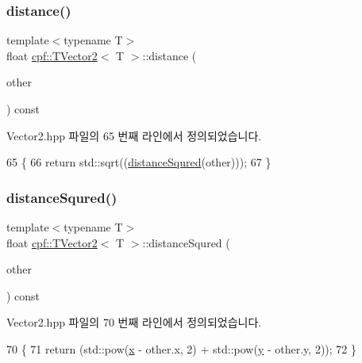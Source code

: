 \subsubsection{\texorpdfstring{distance()}{distance()}}
{\footnotesize\ttfamily template$<$typename T$>$ \\
float \hyperlink{classcpf_1_1_t_vector2}{cpf\+::\+T\+Vector2}$<$ T $>$\+::distance (\begin{DoxyParamCaption}\item[{const \hyperlink{classcpf_1_1_t_vector2}{T\+Vector2}$<$ T $>$ \&}]{other }\end{DoxyParamCaption}) const\hspace{0.3cm}{\ttfamily [inline]}}



Vector2.\+hpp 파일의 65 번째 라인에서 정의되었습니다.


\begin{DoxyCode}
65                                                     \{
66             \textcolor{keywordflow}{return} std::sqrt((\hyperlink{classcpf_1_1_t_vector2_a1acd568ad6397353cd9a0638761d042f}{distanceSqured}(other)));
67         \}
\end{DoxyCode}
\mbox{\label{classcpf_1_1_t_vector2_a1acd568ad6397353cd9a0638761d042f}} 
\subsubsection{\texorpdfstring{distance\+Squred()}{distanceSqured()}}
{\footnotesize\ttfamily template$<$typename T$>$ \\
float \hyperlink{classcpf_1_1_t_vector2}{cpf\+::\+T\+Vector2}$<$ T $>$\+::distance\+Squred (\begin{DoxyParamCaption}\item[{const \hyperlink{classcpf_1_1_t_vector2}{T\+Vector2}$<$ T $>$ \&}]{other }\end{DoxyParamCaption}) const\hspace{0.3cm}{\ttfamily [inline]}}



Vector2.\+hpp 파일의 70 번째 라인에서 정의되었습니다.


\begin{DoxyCode}
70                                                           \{
71             \textcolor{keywordflow}{return} (std::pow(\hyperlink{classcpf_1_1_t_vector2_a2c0ac9258353351f1435070a2307e9e1}{x} - other.x, 2) + std::pow(\hyperlink{classcpf_1_1_t_vector2_a727b923b39a876bbb13c810bcf6eecff}{y} - other.y, 2));
72         \}
\end{DoxyCode}
\mbox{\label{classcpf_1_1_t_vector2_ac360f947c6e26a7ae146da86baaaa20e}} 
